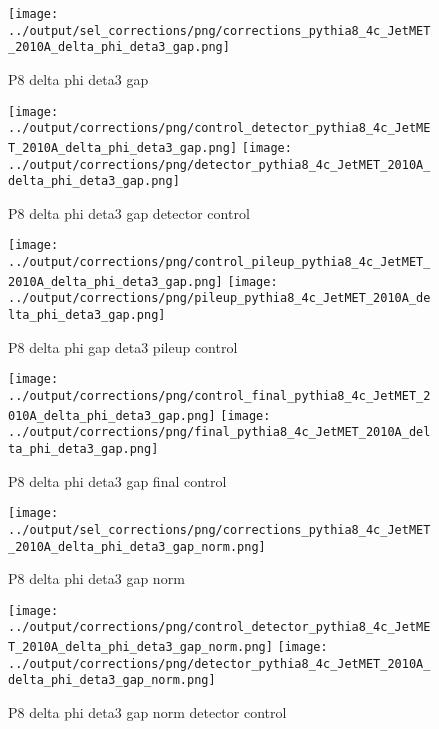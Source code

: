 \documentclass[11pt]{book}
\begin{document}
\begin{figure}[ht]
\centering
\texttt{[image: ../output/sel\_corrections/png/corrections\_pythia8\_4c\_JetMET\_2010A\_delta\_phi\_deta3\_gap.png]}
\caption{P8 delta phi deta3 gap}
\label{fig:p8_JetMET_2010A_delta_phi_deta3_gap}
\end{figure}

\begin{figure}[ht]
\centering
\texttt{[image: ../output/corrections/png/control\_detector\_pythia8\_4c\_JetMET\_2010A\_delta\_phi\_deta3\_gap.png]}
\texttt{[image: ../output/corrections/png/detector\_pythia8\_4c\_JetMET\_2010A\_delta\_phi\_deta3\_gap.png]}
\caption{P8 delta phi deta3 gap detector control}
\label{fig:p8_JetMET_2010A_delta_phi_deta3_gap_detector_control}
\end{figure}

\begin{figure}[ht]
\centering
\texttt{[image: ../output/corrections/png/control\_pileup\_pythia8\_4c\_JetMET\_2010A\_delta\_phi\_deta3\_gap.png]}
\texttt{[image: ../output/corrections/png/pileup\_pythia8\_4c\_JetMET\_2010A\_delta\_phi\_deta3\_gap.png]}
\caption{P8 delta phi gap deta3 pileup control}
\label{fig:p8_JetMET_2010A_delta_phi_deta3_gap_pileup_control}
\end{figure}


\begin{figure}[ht]
\centering
\texttt{[image: ../output/corrections/png/control\_final\_pythia8\_4c\_JetMET\_2010A\_delta\_phi\_deta3\_gap.png]}
\texttt{[image: ../output/corrections/png/final\_pythia8\_4c\_JetMET\_2010A\_delta\_phi\_deta3\_gap.png]}
\caption{P8 delta phi deta3 gap final control}
\label{fig:p8_JetMET_2010A_delta_phi_deta3_gap_final_control}
\end{figure}


\begin{figure}[ht]
\centering
\texttt{[image: ../output/sel\_corrections/png/corrections\_pythia8\_4c\_JetMET\_2010A\_delta\_phi\_deta3\_gap\_norm.png]}
\caption{P8 delta phi deta3 gap norm}
\label{fig:p8_JetMET_2010A_delta_phi_deta3_gap_norm}
\end{figure}


\begin{figure}[ht]
\centering
\texttt{[image: ../output/corrections/png/control\_detector\_pythia8\_4c\_JetMET\_2010A\_delta\_phi\_deta3\_gap\_norm.png]}
\texttt{[image: ../output/corrections/png/detector\_pythia8\_4c\_JetMET\_2010A\_delta\_phi\_deta3\_gap\_norm.png]}
\caption{P8 delta phi deta3 gap norm detector control}
\label{fig:p8_JetMET_2010A_delta_phi_deta3_gap_norm_detector_control}
\end{figure}
\end{document}
